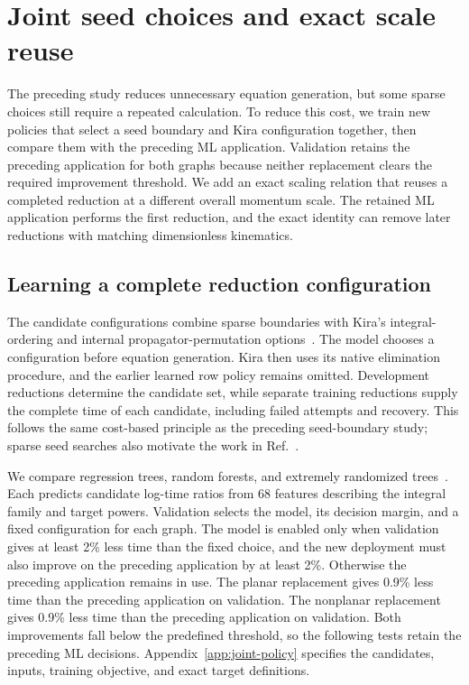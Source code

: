 \section{Joint seed choices and exact scale reuse}
\label{sec:joint-policy}
The preceding study reduces unnecessary equation generation, but some sparse choices still require a repeated calculation. To reduce this cost, we train new policies that select a seed boundary and Kira configuration together, then compare them with the preceding ML application. Validation retains the preceding application for both graphs because neither replacement clears the required improvement threshold. We add an exact scaling relation that reuses a completed reduction at a different overall momentum scale. The retained ML application performs the first reduction, and the exact identity can remove later reductions with matching dimensionless kinematics.

\subsection{Learning a complete reduction configuration}
The candidate configurations combine sparse boundaries with Kira's integral-ordering and internal propagator-permutation options~\cite{Kira2,Kira3}. The model chooses a configuration before equation generation. Kira then uses its native elimination procedure, and the earlier learned row policy remains omitted. Development reductions determine the candidate set, while separate training reductions supply the complete time of each candidate, including failed attempts and recovery. This follows the same cost-based principle as the preceding seed-boundary study; sparse seed searches also motivate the work in Ref.~\cite{TubeSeeding2026}.

We compare regression trees, random forests, and extremely randomized trees~\cite{CART1984,Breiman2001Forest,Geurts2006ExtraTrees}. Each predicts candidate log-time ratios from 68 features describing the integral family and target powers. Validation selects the model, its decision margin, and a fixed configuration for each graph. The model is enabled only when validation gives at least 2\% less time than the fixed choice, and the new deployment must also improve on the preceding application by at least 2\%. Otherwise the preceding application remains in use. The planar replacement gives 0.9\% less time than the preceding application on validation. The nonplanar replacement gives 0.9\% less time than the preceding application on validation. Both improvements fall below the predefined threshold, so the following tests retain the preceding ML decisions. Appendix~\ref{app:joint-policy} specifies the candidates, inputs, training objective, and exact target definitions.

